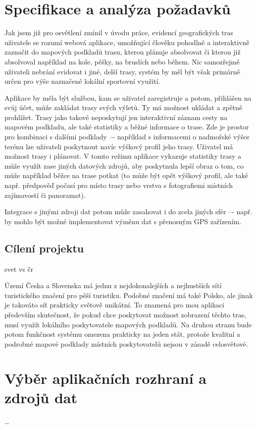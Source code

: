 \chapter{Specifikace a analýza požadavků}

Jak jsem již pro osvětlení zmínil v úvodu práce, evidencí
geografických tras uživatele se rozumí webová aplikace, umožňující
člověku pohodlně a interaktivně zaznačit do mapových podkladů trasu,
kterou plánuje absolvovat či kterou již absolvoval například na kole,
pěšky, na bruslích nebo během. Nic samozřejmě uživateli nebrání
evidovat i jiné, delší trasy, systém by měl být však primárně určen
pro výše naznačené lokální sportovní využití.

Aplikace by měla být službou, kam se uživatel zaregistruje a potom,
přihlášen na svůj účet, může zakládat trasy svých výletů. Ty má
možnost ukládat a zpětně prohlížet. Trasy jako takové neposkytují jen
interaktivní záznam cesty na mapovém podkladu, ale také statistiky a
běžné informace o trase. Zde je prostor pro kombinaci s dalšími
podklady –- například s informacemi o nadmořské výšce terénu lze
uživateli poskytnout navíc výškový profil jeho trasy. Uživatel má
možnost trasy i plánovat. V tomto režimu aplikace vykazuje statistiky
trasy a může využít zase jiných datových zdrojů, aby poskytnula lepší
obraz o tom, co může například běžce na trase potkat (to může být
opět výškový profil, ale také např. předpověď počasí pro místo trasy
nebo vrstva s fotografiemi místních zajímavostí či panoramat).

Integrace s jinými zdroji dat potom může zasahovat i do zcela jiných
sfér –- např. by mohlo být možné implementovat výměnu dat s přenosným
GPS zařízením.

\section{Cílení projektu}
svet vs čr

Území Česka a Slovenska má jednu z nejdokonalejších a nejhustších sítí turistického 
značení pro pěší turistiku. Podobné značení má také Polsko, ale jinak je takováto síť prakticky 
světově unikátní. To znamená pro mou aplikaci především skutečnost, že pokud chce poskytovat 
možnost zobrazení těchto tras, musí využít lokálního poskytovatele mapových podkladů. Na 
druhou stranu bude potom funkčnost systému omezena prakticky na jeden stát, protože kvalitní 
a podrobné mapové podklady místních poskytovatelů nejsou v zásadě celosvětové.

\chapter{Výběr aplikačních rozhraní a zdrojů dat}
\ldots

